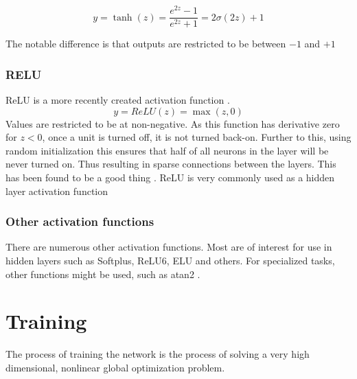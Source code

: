 \documentclass[12pt,parskip]{komatufte}
\begin{document}
\begin{equation}
y=\tanh(z)=\frac{e^{2z}-1}{e^{2z}+1}=2\sigma(2z)+1
\end{equation}

The notable difference is that outputs are restricted to be between $-1$ and $+1$

\subsubsection{RELU}
ReLU is a more recently created activation function .
\begin{equation}
y=ReLU(z)=\max \left( z, 0 \right)
\end{equation}
Values are restricted to be at non-negative.
As this function has derivative zero for $z<0$, once a unit is turned off, it is not turned back-on.
Further to this, using random initialization this ensures that half of all neurons in the layer will be never turned on.
Thus resulting in sparse connections between the layers.
This has been found to be a good thing .
ReLU is very commonly used as a hidden layer activation function


\subsubsection{Other activation functions}

There are numerous other activation functions.
Most are of interest for use in hidden layers such as Softplus, ReLU6, ELU and others.
For specialized tasks, other functions might be used, such as atan2 .


\section{Training}
The process of training the network is the process of solving a very high dimensional, nonlinear global optimization problem.

\end{document}
